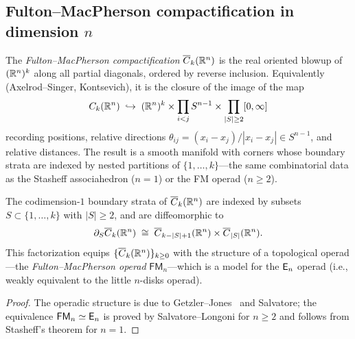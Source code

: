 \subsection{\texorpdfstring{Fulton--MacPherson compactification in dimension $n$}{Fulton--MacPherson compactification in dimension n}}
\label{subsec:fm-general-n}

\begin{definition}
\label{def:fm-rn}
The \emph{Fulton--MacPherson compactification}
$\overline{C}_k(\mathbb{R}^n)$ is the real oriented blowup of $(\mathbb{R}^n)^k$
along all partial diagonals, ordered by reverse inclusion.
Equivalently (Axelrod--Singer, Kontsevich), it is the closure of
the image of the map
\[
C_k(\mathbb{R}^n)
\;\hookrightarrow\;
(\mathbb{R}^n)^k
\times \prod_{i<j} S^{n-1}
\times \prod_{|S| \geq 2} [0, \infty]
\]
recording positions, relative directions
$\theta_{ij} = (x_i - x_j)/|x_i - x_j| \in S^{n-1}$,
and relative distances.  The result is a smooth manifold with
corners whose boundary strata are indexed by nested partitions
of $\{1, \ldots, k\}$---the same combinatorial data as the
Stasheff associahedron ($n = 1$) or the FM operad ($n \geq 2$).
\end{definition}

\begin{proposition}
\label{prop:fm-boundary-strata}
The codimension-$1$ boundary strata of
$\overline{C}_k(\mathbb{R}^n)$ are indexed by subsets
$S \subset \{1, \ldots, k\}$ with $|S| \geq 2$, and are
diffeomorphic to
\[
\partial_S \overline{C}_k(\mathbb{R}^n)
\;\cong\;
\overline{C}_{k-|S|+1}(\mathbb{R}^n)
\times
\overline{C}_{|S|}(\mathbb{R}^n).
\]
This factorization equips $\{\overline{C}_k(\mathbb{R}^n)\}_{k \geq 0}$
with the structure of a topological operad---the
\emph{Fulton--MacPherson operad} $\mathsf{FM}_n$---which is a model
for the $\mathsf{E}_n$ operad \textup{(}i.e., weakly equivalent to the
little $n$-disks operad\textup{)}.
\end{proposition}

\begin{proof}
The operadic structure is due to Getzler--Jones~\cite{GJ}
and Salvatore; the equivalence $\mathsf{FM}_n \simeq \mathsf{E}_n$ is
proved by Salvatore--Longoni for $n \geq 2$ and follows from
Stasheff's theorem for $n = 1$.
\end{proof}



